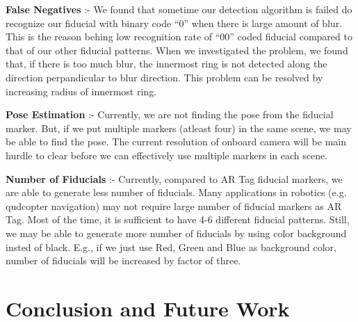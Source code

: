 \documentclass[runningheads]{llncs}
\begin{document}
\textbf{False Negatives} :- We found that sometime our detection algorithm is
failed do recognize our fiducial with binary code ``0'' when there is large
amount of blur. This is the reason behing low recognition rate of ``00''
coded fiducial compared to that of our other fiducial patterns. When we
investigated the problem, we found that, if there is too much blur, the
innermost ring is not detected along the direction perpandicular to blur
direction. This problem can be resolved by increasing radius of innermost ring.

\textbf{Pose Estimation} :- Currently, we are not finding the pose from the
fiducial marker. But, if we put multiple markers (atleast four) in the same
scene, we may be able to find the pose. The current resolution of onboard camera
will be main hurdle to clear before we can effectively use multiple markers in
each scene.

\textbf{Number of Fiducials} :- Currently, compared to AR Tag fiducial markers,
we are able to generate less number of fiducials. Many applications in
robotics (e.g. qudcopter navigation) may not require large number of fiducial
markers as AR Tag. Most of the time, it is sufficient to have 4-6
different fiducial patterns. Still, we may be able to generate more number of
fiducials by using color background insted of black. E.g., if we just use Red,
Green and Blue as background color, number of fiducials will be increased by
factor of three.

\section{Conclusion and Future Work}




\end{document}
